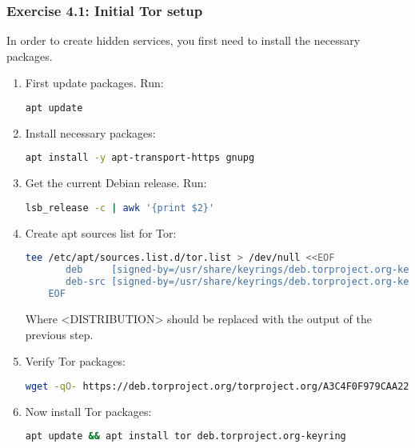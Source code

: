 \subsubsection{Exercise 4.1: Initial Tor setup}
In order to create hidden services, you first need to install the necessary packages.
\begin{enumerate}
    \item First update packages. Run:
    \begin{lstlisting}[language=bash]
    apt update
    \end{lstlisting}
    \item Install necessary packages:
    \begin{lstlisting}[language=bash]
    apt install -y apt-transport-https gnupg
    \end{lstlisting}
    \item Get the current Debian release. Run:
    \begin{lstlisting}[language=bash]
    lsb_release -c | awk '{print $2}'
    \end{lstlisting}
    \item Create apt sources list for Tor:
    \begin{lstlisting}[language=bash, breaklines=true, breakatwhitespace=true, columns=flexible]
    tee /etc/apt/sources.list.d/tor.list > /dev/null <<EOF
       deb     [signed-by=/usr/share/keyrings/deb.torproject.org-keyring.gpg] https://deb.torproject.org/torproject.org <DISTRIBUTION> main
       deb-src [signed-by=/usr/share/keyrings/deb.torproject.org-keyring.gpg] https://deb.torproject.org/torproject.org <DISTRIBUTION> main
    EOF
    \end{lstlisting}
    Where <DISTRIBUTION> should be replaced with the output of the previous step.
    \item Verify Tor packages:
    {\footnotesize
    \begin{lstlisting}[language=bash, breaklines=true, columns=flexible]
    wget -qO- https://deb.torproject.org/torproject.org/A3C4F0F979CAA22CDBA8F512EE8CBC9E886DDD89.asc | gpg --dearmor | tee /usr/share/keyrings/deb.torproject.org-keyring.gpg >/dev/null
    \end{lstlisting}
    }
    \item Now install Tor packages:
    \begin{lstlisting}[language=bash]
    apt update && apt install tor deb.torproject.org-keyring
    \end{lstlisting}
\end{enumerate}

